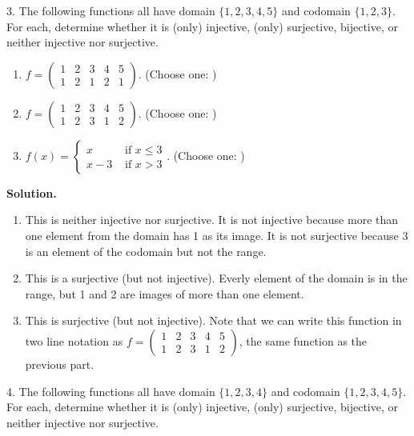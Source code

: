 \documentclass[10pt,]{book}
\theoremstyle{plain}
\theoremstyle{definition}
\theoremstyle{definition}
\numberwithin{equation}{chapter}
\newcommand{\twoline}[2]{\begin{pmatrix}#1 \\ #2 \end{pmatrix}}
\newcommand{\gt}{>}
\newcommand{\amp}{&}
\begin{document}
\begin{exerciselist}
\begin{enumerate}[label=(\alph*)]
\end{enumerate}
%
\par
\item[3.]\hypertarget{exercise-45}{}\noindent%
\hypertarget{p-657}{}%
The following functions all have domain \(\{1,2,3,4,5\}\)  and codomain \(\{1,2,3\}\).  For each, determine whether it is (only) injective, (only) surjective, bijective, or neither injective nor surjective.%
\par
\hypertarget{p-658}{}%
\leavevmode%
\begin{enumerate}[label=(\alph*)]
\item\hypertarget{li-419}{}\hypertarget{p-659}{}%
\(f = \twoline{1 \amp 2 \amp 3 \amp 4 \amp 5}{1 \amp 2 \amp 1 \amp 2 \amp 1}\). (Choose one: )%
\item\hypertarget{li-420}{}\hypertarget{p-660}{}%
\(f = \twoline{1 \amp 2 \amp 3 \amp 4 \amp 5}{1 \amp 2 \amp 3 \amp 1 \amp 2}\). (Choose one: )%
\item\hypertarget{li-421}{}\hypertarget{p-661}{}%
\(f(x) = \begin{cases} x \amp \text{ if } x \le 3 \\ x-3 \amp \text{ if } x \gt 3\end{cases}\). (Choose one: )%
\end{enumerate}
%
\par
\medskip\noindent%
\textbf{Solution.}\quad \hypertarget{p-662}{}%
\leavevmode%
\begin{enumerate}[label=(\alph*)]
\item\hypertarget{li-422}{}\hypertarget{p-663}{}%
This is neither injective nor surjective.  It is not injective because more than one element from the domain has 1 as its image.  It is not surjective because 3 is an element of the codomain but not the range.%
\item\hypertarget{li-423}{}\hypertarget{p-664}{}%
This is a surjective (but not injective).  Everly element of the domain is in the range, but 1 and 2 are images of more than one element.%
\item\hypertarget{li-424}{}\hypertarget{p-665}{}%
This is surjective (but not injective).  Note that we can write this function in two line notation as \(f = \twoline{1 \amp 2 \amp 3 \amp 4 \amp 5}{1 \amp 2 \amp 3 \amp 1 \amp 2}\), the same function as the previous part.%
\end{enumerate}
%
\par
\item[4.]\hypertarget{exercise-46}{}\noindent%
\hypertarget{p-666}{}%
The following functions all have domain \(\{1,2,3,4\}\)  and codomain \(\{1,2,3,4,5\}\).  For each, determine whether it is (only) injective, (only) surjective, bijective, or neither injective nor surjective.%

\end{exerciselist}
\end{document}
